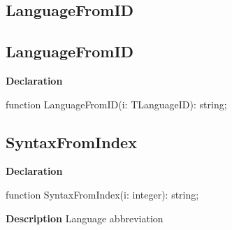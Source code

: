 \documentclass{report}
\newif\ifpdf
\begin{document}
\subsection*{\large{\textbf{LanguageFromID}}\normalsize\hspace{1ex}\hrulefill}
\else
\subsection*{LanguageFromID}
\fi
\label{PasDoc_Languages-LanguageFromID}
\begin{list}{}{
\setlength{\itemindent}{0cm}
\setlength{\listparindent}{0cm}
\setlength{\leftmargin}{\evensidemargin}
\addtolength{\leftmargin}{\tmplength}
\settowidth{\labelsep}{X}
\addtolength{\leftmargin}{\labelsep}
\setlength{\labelwidth}{\tmplength}
}
\item[\textbf{Declaration}\hfill]
\ifpdf
\begin{flushleft}
\fi
\begin{ttfamily}
function LanguageFromID(i: TLanguageID): string;\end{ttfamily}

\ifpdf
\end{flushleft}
\fi

\end{list}
\ifpdf
\subsection*{\large{\textbf{SyntaxFromIndex}}\normalsize\hspace{1ex}\hrulefill}
\else
\subsection*{SyntaxFromIndex}
\fi
\label{PasDoc_Languages-SyntaxFromIndex}
\begin{list}{}{
\setlength{\itemindent}{0cm}
\setlength{\listparindent}{0cm}
\setlength{\leftmargin}{\evensidemargin}
\addtolength{\leftmargin}{\tmplength}
\settowidth{\labelsep}{X}
\addtolength{\leftmargin}{\labelsep}
\setlength{\labelwidth}{\tmplength}
}
\item[\textbf{Declaration}\hfill]
\ifpdf
\begin{flushleft}
\fi
\begin{ttfamily}
function SyntaxFromIndex(i: integer): string;\end{ttfamily}

\ifpdf
\end{flushleft}
\fi

\par
\item[\textbf{Description}]
Language abbreviation

\end{list}
\ifpdf
\end{document}
